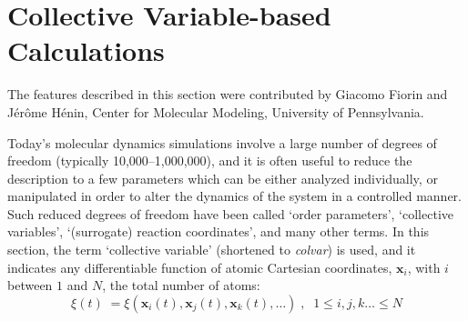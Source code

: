 \section{Collective Variable-based Calculations}
\label{section:colvars}

The features described in this section were contributed by
Giacomo Fiorin and J\'er\^ome H\'enin, Center for Molecular Modeling,
University of Pennsylvania.

Today's molecular dynamics simulations involve a large number of
degrees of freedom (typically 10,000--1,000,000), and it is often
useful to reduce the description to a few parameters which can be
either analyzed individually, or manipulated in order to alter the
dynamics of the system in a controlled manner.  Such reduced degrees
of freedom have been called `order parameters', `collective
variables', `(surrogate) reaction coordinates', and many other terms.
In this section, the term `collective variable' (shortened to
\textit{colvar}) is used, and it indicates any differentiable function
of atomic Cartesian coordinates, $\bm{x}_{i}$, with $i$ between
$1$ and $N$, the total number of atoms:
\begin{equation} 
  \label{eq:colvar_basic}
  \xi(t) \; = \xi\left(\bm{x}_{i}(t), \bm{x}_{j}(t), \bm{x}_{k}(t),
  \ldots \right)\;, \;\; 1 \leq i,j,k\ldots \leq N
\end{equation}

